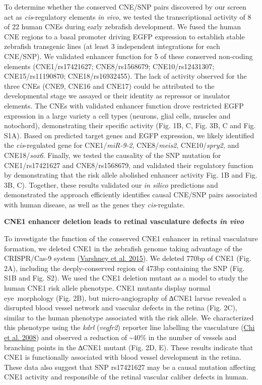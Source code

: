 \documentclass[]{article}
\begin{document}
To determine whether the conserved CNE/SNP pairs discovered by our
screen act as \emph{cis}-regulatory elements \emph{in vivo}, we tested
the transcriptional activity of 8 of 22 human CNEs during early
zebrafish development. We fused the human CNE regions to a basal
promoter driving EGFP expression to establish stable zebrafish
transgenic lines (at least 3 independent integrations for each CNE/SNP).
We validated enhancer function for 5 of these conserved non-coding
elements (CNE1/rs17421627; CNE8/rs1568679; CNE10/rs12431307;
CNE15/rs11190870; CNE18/rs16932455). The lack of activity observed for
the three CNEs (CNE9, CNE16 and CNE17) could be attributed to the
developmental stage we assayed or their identity as repressor or
insulator elements. The CNEs with validated enhancer function drove
restricted EGFP expression in a large variety a cell types (neurons,
glial cells, muscles and notochord), demonstrating their specific
activity (Fig. 1B, C, Fig. 3B, C and Fig. S1A). Based on predicted
target genes and EGFP expression, we likely identified the
\emph{cis}-regulated gene for CNE1/\emph{miR-9-2}, CNE8/\emph{meis2},
CNE10/\emph{spry2,} and CNE18/\emph{sox6}. Finally, we tested the
causality of the SNP mutation for CNE1/rs17421627 and CNE8/rs1568679,
and validated their regulatory function by demonstrating that the risk
allele abolished enhancer activity Fig. 1B and Fig. 3B, C). Together,
these results validated our \emph{in silico} predictions and
demonstrated the approach efficiently identifies causal CNE/SNP pairs
associated with human disease, as well as the genes they
\emph{cis}-regulate.

\textbf{CNE1 enhancer deletion leads to retinal vasculature defects
\emph{in vivo}}

To investigate the function of the conserved CNE1 enhancer in retinal
vasculature formation, we deleted CNE1 in the zebrafish genome taking
advantage of the CRISPR/Cas-9 system
(\protect\hyperlink{_ENREF_33}{Varshney et al. 2015}). We deleted 770bp
of CNE1 (Fig. 2A), including the deeply-conserved region of 473bp
containing the SNP (Fig. S1B and Fig. S2). We used the CNE1 deletion
mutant as a model to study the human CNE1 risk allele phenotype. CNE1
mutants display normal eye~morphology (Fig. 2B), but micro-angiography
of ∆CNE1 larvae revealed a disrupted blood vessel network and vascular
defects in the retina (Fig. 2C), similar to the human phenotype
associated with the risk allele. We characterized this phenotype using
the \emph{kdrl} (\emph{vegfr2}) reporter line labelling the vasculature
(\protect\hyperlink{_ENREF_2}{Chi et al. 2008}) and observed a reduction
of \textasciitilde{}40\% in the number of vessels and branching points
in the ∆CNE1 mutant (Fig. 2D, E). These results indicate that CNE1 is
functionally associated with blood vessel development in the retina.
These data also suggest that SNP rs17421627 may be a causal mutation
affecting CNE1 activity and responsible of the retinal vascular caliber
defects in human.
\end{document}

